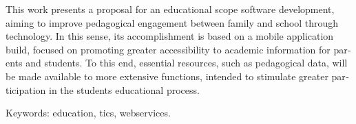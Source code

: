 \begin{resumo}[Abstract]
  \begin{otherlanguage}{english}
	  This work presents a proposal for an educational scope software development, aiming to improve pedagogical engagement between family and school through technology. In this sense, its accomplishment is based on a mobile application build, focused on promoting greater accessibility to academic information for parents and students. To this end, essential resources, such as pedagogical data, will be made available to more extensive functions, intended to stimulate greater participation in the students educational process.

Keywords: education, tics, webservices.
  \end{otherlanguage}
\end{resumo}